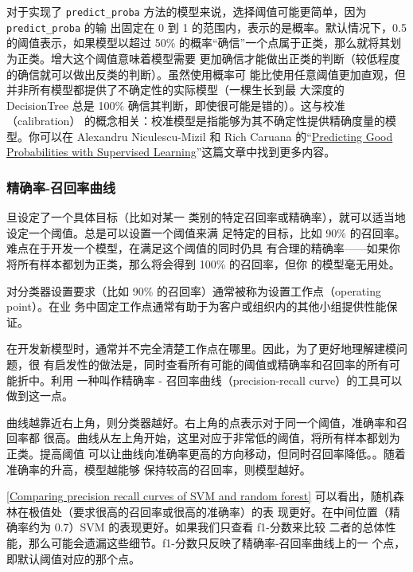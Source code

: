 对于实现了 \verb|predict_proba| 方法的模型来说，选择阈值可能更简单，因为 \verb|predict_proba| 的输
出固定在 0 到 1 的范围内，表示的是概率。默认情况下，0.5 的阈值表示，如果模型以超过
50\% 的概率“确信”一个点属于正类，那么就将其划为正类。增大这个阈值意味着模型需要
更加确信才能做出正类的判断（较低程度的确信就可以做出反类的判断）。虽然使用概率可
能比使用任意阈值更加直观，但并非所有模型都提供了不确定性的实际模型（一棵生长到最
大深度的 DecisionTree 总是 100\% 确信其判断，即使很可能是错的）。这与校准（calibration）
的概念相关：校准模型是指能够为其不确定性提供精确度量的模型。你可以在 Alexandru Niculescu-Mizil 和 Rich Caruana 的“\href{http://lkm.fri.uni-lj.si/xaigor/eng/scipaper/niculescumizilcaruana05-icml.pdf}{Predicting Good Probabilities with Supervised Learning}”这篇文章中找到更多内容。
\subsubsection{精确率-召回率曲线}
旦设定了一个具体目标（比如对某一
类别的特定召回率或精确率），就可以适当地设定一个阈值。总是可以设置一个阈值来满
足特定的目标，比如 90\% 的召回率。难点在于开发一个模型，在满足这个阈值的同时仍具
有合理的精确率——如果你将所有样本都划为正类，那么将会得到 100\% 的召回率，但你
的模型毫无用处。

对分类器设置要求（比如 90\% 的召回率）通常被称为设置工作点（operating point）。在业
务中固定工作点通常有助于为客户或组织内的其他小组提供性能保证。

在开发新模型时，通常并不完全清楚工作点在哪里。因此，为了更好地理解建模问题，很
有启发性的做法是，同时查看所有可能的阈值或精确率和召回率的所有可能折中。利用
一种叫作精确率 - 召回率曲线（precision-recall curve）的工具可以做到这一点。

曲线越靠近右上角，则分类器越好。右上角的点表示对于同一个阈值，准确率和召回率都
很高。曲线从左上角开始，这里对应于非常低的阈值，将所有样本都划为正类。提高阈值
可以让曲线向准确率更高的方向移动，但同时召回率降低。。随着准确率的升高，模型越能够
保持较高的召回率，则模型越好。

\autoref{Comparing precision recall curves of SVM and random forest} 可以看出，随机森林在极值处（要求很高的召回率或很高的准确率）的表
现更好。在中间位置（精确率约为 0.7）SVM 的表现更好。如果我们只查看 f1-分数来比较
二者的总体性能，那么可能会遗漏这些细节。f1-分数只反映了精确率-召回率曲线上的一
个点，即默认阈值对应的那个点。

